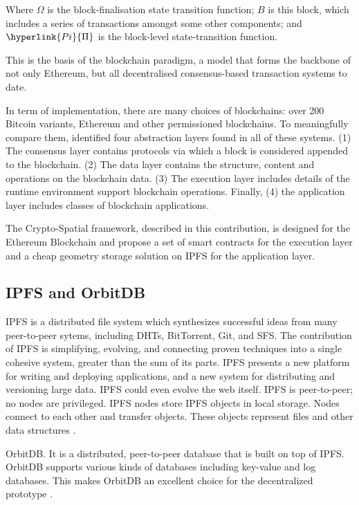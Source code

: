 \documentclass{isprs} %
\begin{document}
Where \hyperlink{Omega}{$\Omega$} is the block-finalisation state transition function; \hyperlink{block}{$B$} is this block, which includes a series of transactions amongst some other components; and $\hyperlink{Pi}{\Pi}$ is the block-level state-transition function.

This is the basis of the blockchain paradigm, a model that forms the backbone of not only Ethereum, but all decentralised consensus-based transaction systems to date.

In term of implementation, there are many choices of blockchains: over 200 Bitcoin variants, Ethereum and other permissioned blockchains. To meaningfully compare them, \cite{dinh2017blockbench} identified four abstraction layers found in all of these systems. (1) The consensus layer contains protocols via which a block is considered appended to the blockchain. (2) The data layer contains the structure, content and operations on the blockchain data. (3) The execution layer includes details of the runtime environment support blockchain operations. Finally, (4) the application layer includes classes of blockchain applications. 

The Crypto-Spatial framework, described in this contribution, is designed for the Ethereum Blockchain and propose a set of smart contracts for the execution layer and a cheap geometry storage solution on IPFS for the application layer.

\subsection{IPFS and OrbitDB}\label{sec:IPFS and OrbitDB}

IPFS is a distributed file system which synthesizes successful ideas from many peer-to-peer sytems, including DHTs, BitTorrent, Git, and SFS. The contribution of IPFS is simplifying, evolving, and connecting proven techniques into a single cohesive system, greater than the sum of its parts. IPFS presents a new platform for writing and deploying applications, and a new system for distributing and versioning large data. IPFS could even evolve the web itself. IPFS is peer-to-peer; no nodes are privileged. IPFS nodes store IPFS objects in local storage. Nodes connect to each other and transfer objects. These objects represent files and other data structures \cite{benet2014ipfs}.

OrbitDB. It is a distributed, peer-to-peer database that is built on top of IPFS. OrbitDB supports various kinds of databases including key-value and log databases. This makes OrbitDB an excellent choice for the decentralized prototype  \cite{orbitdb}. 
\end{document}
